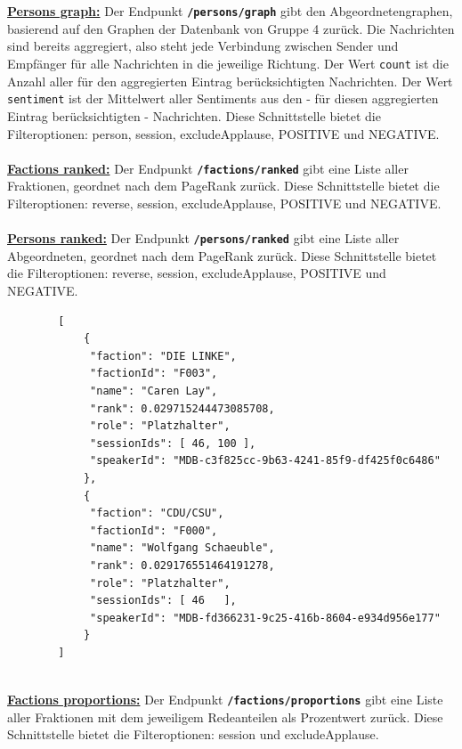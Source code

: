 \\~\\
\textbf{\underline{Persons graph:}}\newline
Der Endpunkt \textbf{\texttt{/persons/graph}} gibt den Abgeordnetengraphen, basierend auf den Graphen der Datenbank von Gruppe 4 zurück. 
Die Nachrichten sind bereits aggregiert, also steht jede Verbindung zwischen Sender und Empfänger für alle Nachrichten in die jeweilige Richtung. Der Wert \texttt{count} ist die Anzahl aller für den aggregierten Eintrag berücksichtigten Nachrichten. Der Wert \texttt{sentiment} ist der Mittelwert aller Sentiments aus den - für diesen aggregierten Eintrag berücksichtigten - Nachrichten. Diese Schnittstelle bietet die Filteroptionen: person, session, excludeApplause, POSITIVE und NEGATIVE.	
\\~\\
\textbf{\underline{Factions ranked:}}\newline
Der Endpunkt \textbf{\texttt{/factions/ranked}} gibt eine Liste aller Fraktionen, geordnet nach dem PageRank zurück. Diese Schnittstelle bietet die Filteroptionen: reverse, session, excludeApplause, POSITIVE und NEGATIVE.
\\~\\
\textbf{\underline{Persons ranked:}}\newline
Der Endpunkt \textbf{\texttt{/persons/ranked}} gibt eine Liste aller Abgeordneten, geordnet nach dem PageRank zurück. Diese Schnittstelle bietet die Filteroptionen: reverse, session, excludeApplause, POSITIVE und NEGATIVE.
~\\
\begin{lstlisting}
		[
			{
			 "faction": "DIE LINKE",
			 "factionId": "F003", 
			 "name": "Caren Lay", 
			 "rank": 0.029715244473085708, 
			 "role": "Platzhalter",
			 "sessionIds": [ 46, 100 ],
			 "speakerId": "MDB-c3f825cc-9b63-4241-85f9-df425f0c6486"
			}, 
			{
			 "faction": "CDU/CSU",    
			 "factionId": "F000",
			 "name": "Wolfgang Schaeuble", 
			 "rank": 0.029176551464191278, 
			 "role": "Platzhalter",   
			 "sessionIds": [ 46   ], 
			 "speakerId": "MDB-fd366231-9c25-416b-8604-e934d956e177"
			}
		]
\end{lstlisting}
~\\	
\textbf{\underline{Factions proportions:}}\newline
Der Endpunkt \textbf{\texttt{/factions/proportions}} gibt eine Liste aller Fraktionen mit dem jeweiligem Redeanteilen als Prozentwert zurück. Diese Schnittstelle bietet die Filteroptionen: session und excludeApplause.
